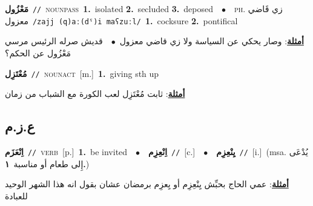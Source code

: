 \documentclass[10pt,a4paper,twoside]{article} %
\begin{document}
\begin{multicols}{2}
{\setlength\topsep{0pt}\textbf{\foreignlanguage{arabic}{مَعْزُول}}\ {\color{gray}\texttt{//}\color{black}}\ \textsc{noun\textunderscore pass}\ \textbf{1.}~isolated  \textbf{2.}~secluded  \textbf{3.}~deposed\ \ $\bullet$\ \ \textsc{ph.} \color{gray} \foreignlanguage{arabic}{زي قَاضي معزول}\color{black}\ {\color{gray}\texttt{/{\sffamily zajj (q)aː(dˤ)i maʕzuːl}/}\color{black}}\ \textbf{1.}~cocksure  \textbf{2.}~pontifical\  \begin{flushright}\color{gray}\foreignlanguage{arabic}{\textbf{\underline{\foreignlanguage{arabic}{أمثلة}}}: وصار يحكي عن السياسة ولا زي قاضي معزول\ $\bullet$\ \  قديش صرله الرئيس مرسي مَعْزُول عن الحكم؟}\end{flushright}\color{black}} \vspace{2mm}

{\setlength\topsep{0pt}\textbf{\foreignlanguage{arabic}{مُعْتَزِل}}\ {\color{gray}\texttt{//}\color{black}}\ \textsc{noun\textunderscore act}\ [m.]\ \textbf{1.}~giving sth up\  \begin{flushright}\color{gray}\foreignlanguage{arabic}{\textbf{\underline{\foreignlanguage{arabic}{أمثلة}}}: ثابت مُعْتَزِل لعب الكورة مع الشباب من زمان}\end{flushright}\color{black}} \vspace{2mm}

\vspace{-3mm}
\subsection*{\color{blue}\foreignlanguage{arabic}{ع.ز.م}\color{blue}{}} 

{\setlength\topsep{0pt}\textbf{\foreignlanguage{arabic}{اِنْعَزَم}}\ {\color{gray}\texttt{//}\color{black}}\ \textsc{verb}\ [p.]\ \textbf{1.}~be invited\ \ $\bullet$\ \ \setlength\topsep{0pt}\textbf{\foreignlanguage{arabic}{اِنْعِزِم}}\ {\color{gray}\texttt{//}\color{black}}\ [c.]\ \ $\bullet$\ \ \setlength\topsep{0pt}\textbf{\foreignlanguage{arabic}{يِنْعِزِم}}\ {\color{gray}\texttt{//}\color{black}}\ [i.]\ \color{gray}(msa. \foreignlanguage{arabic}{يُدْعَى إِلى طعام أو مناسبة}~\foreignlanguage{arabic}{\textbf{١.}})\color{black}\  \begin{flushright}\color{gray}\foreignlanguage{arabic}{\textbf{\underline{\foreignlanguage{arabic}{أمثلة}}}: عمي الحاج بحبِّش يِنْعِزِم أو يِعزِم برمضان عشان بقول انه هذا الشهر الوحيد للعبادة}\end{flushright}\color{black}} \vspace{2mm}


\end{multicols}
\end{document}
